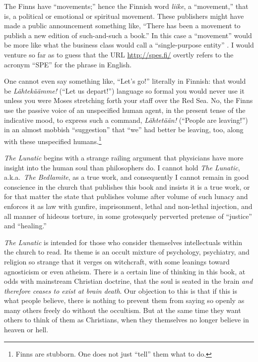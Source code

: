\documentclass[letterpaper]{article}
\begin{document}
The Finns have ``movements;'' hence the Finnish word \textit{liike}, a ``movement,'' that is, a political or emotional or spiritual movement.  These publishers might have made a public announcement something like, ``There has been a movement to publish a new edition of such-and-such a book.''  In this case a ``movement'' would be more like what the business class would call a ``single-purpose entity'' \cite{rixon2015spe}.  I would venture so far as to guess that the URL \url{http://spes.fi/} \cite{google2016akateeminen} overtly refers to the acronym ``SPE'' for the phrase in English.

One cannot even say something like, ``Let's go!'' literally in Finnish: that would be \textit{L{\"a}htek{\"a}{\"a}mme!} (``Let us depart!'') language so formal you would never use it unless you were Moses stretching forth your staff over the Red Sea.  No, the Finns use the passive voice of an unspecified human agent, in the present tense of the indicative mood, to express such a command,  \textit{L{\"a}htet{\"a}{\"a}n!} (``People are leaving!'') in an almost mobbish ``suggestion'' that ``we'' had better be leaving, too, along with these unspecified humans.\footnote{Finns are stubborn.  One does not just ``tell'' them what to do.}

\textit{The Lunatic} begins with a strange railing argument that physicians have more insight into the human soul than philosophers do.  I cannot hold \textit{The Lunatic}, a.k.a.\ \textit{The Bedlamite}, as a true work, and consequently I cannot remain in good conscience in the church that publishes this book and insists it is a true work, or for that matter the state that publishes volume after volume of such lunacy \cite[etc.]{rcw-10.77,rcw-71,rcw-72.06,rcw-72.23,rcw-72.27,rcw-72.25,rcw-72.29,rcw-37.12.010.4,bigfoot1969,bigfoot1984} and enforces it as law with gunfire, imprisonment, lethal and non-lethal injection, and all manner of hideous torture, in some grotesquely perverted pretense of ``justice'' and ``healing.''

\textit{The Lunatic} is intended for those who consider themselves intellectuals within the church to read.  Its theme is an occult mixture of psychology, psychiatry, and religion so strange that it verges on witchcraft, with some leanings toward agnosticism or even atheism.  There is a certain line of thinking in this book, at odds with mainstream Christian doctrine, that the soul is seated in the brain \textit{and therefore ceases to exist at brain death}.  Our objection to this is that if this is what people believe, there is nothing to prevent them from saying so openly as many others freely do without the occultism.  But at the same time they want others to think of them as Christians, when they themselves no longer believe in heaven or hell.
\end{document}
